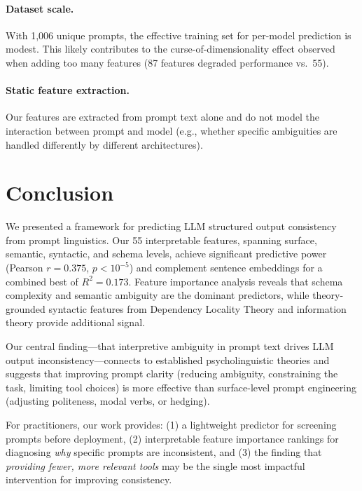 \documentclass{article}
\begin{document}
\paragraph{Dataset scale.}
With 1,006 unique prompts, the effective training set for per-model prediction is modest. This likely contributes to the curse-of-dimensionality effect observed when adding too many features (87 features degraded performance vs.\ 55).

\paragraph{Static feature extraction.}
Our features are extracted from prompt text alone and do not model the interaction between prompt and model (e.g., whether specific ambiguities are handled differently by different architectures).


\section{Conclusion}
\label{sec:conclusion}

We presented a framework for predicting LLM structured output consistency from prompt linguistics. Our 55 interpretable features, spanning surface, semantic, syntactic, and schema levels, achieve significant predictive power (Pearson $r = 0.375$, $p < 10^{-5}$) and complement sentence embeddings for a combined best of $R^2 = 0.173$. Feature importance analysis reveals that schema complexity and semantic ambiguity are the dominant predictors, while theory-grounded syntactic features from Dependency Locality Theory and information theory provide additional signal.

Our central finding---that interpretive ambiguity in prompt text drives LLM output inconsistency---connects to established psycholinguistic theories and suggests that improving prompt clarity (reducing ambiguity, constraining the task, limiting tool choices) is more effective than surface-level prompt engineering (adjusting politeness, modal verbs, or hedging).

For practitioners, our work provides: (1) a lightweight predictor for screening prompts before deployment, (2) interpretable feature importance rankings for diagnosing \emph{why} specific prompts are inconsistent, and (3) the finding that \emph{providing fewer, more relevant tools} may be the single most impactful intervention for improving consistency.
\end{document}
